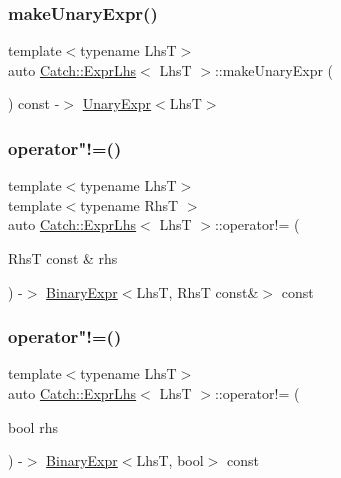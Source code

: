 \subsubsection{\texorpdfstring{make\+Unary\+Expr()}{makeUnaryExpr()}}
{\footnotesize\ttfamily template$<$typename LhsT$>$ \\
auto \mbox{\hyperlink{classCatch_1_1ExprLhs}{Catch\+::\+Expr\+Lhs}}$<$ LhsT $>$\+::make\+Unary\+Expr (\begin{DoxyParamCaption}{ }\end{DoxyParamCaption}) const -\/$>$ \mbox{\hyperlink{classCatch_1_1UnaryExpr}{Unary\+Expr}}$<$LhsT$>$ \hspace{0.3cm}{\ttfamily [inline]}}

\mbox{\label{classCatch_1_1ExprLhs_a5e10eab8aed53dd000b89d8fd7754437}} 
\subsubsection{\texorpdfstring{operator"!=()}{operator!=()}\hspace{0.1cm}{\footnotesize\ttfamily [1/2]}}
{\footnotesize\ttfamily template$<$typename LhsT$>$ \\
template$<$typename RhsT $>$ \\
auto \mbox{\hyperlink{classCatch_1_1ExprLhs}{Catch\+::\+Expr\+Lhs}}$<$ LhsT $>$\+::operator!= (\begin{DoxyParamCaption}\item[{RhsT const \&}]{rhs }\end{DoxyParamCaption}) -\/$>$ \mbox{\hyperlink{classCatch_1_1BinaryExpr}{Binary\+Expr}}$<$LhsT, RhsT const\&$>$ const \hspace{0.3cm}{\ttfamily [inline]}}

\mbox{\label{classCatch_1_1ExprLhs_a60eca847201d057d8a8b7222c69b619c}} 
\subsubsection{\texorpdfstring{operator"!=()}{operator!=()}\hspace{0.1cm}{\footnotesize\ttfamily [2/2]}}
{\footnotesize\ttfamily template$<$typename LhsT$>$ \\
auto \mbox{\hyperlink{classCatch_1_1ExprLhs}{Catch\+::\+Expr\+Lhs}}$<$ LhsT $>$\+::operator!= (\begin{DoxyParamCaption}\item[{bool}]{rhs }\end{DoxyParamCaption}) -\/$>$ \mbox{\hyperlink{classCatch_1_1BinaryExpr}{Binary\+Expr}}$<$LhsT, bool$>$ const \hspace{0.3cm}{\ttfamily [inline]}}

